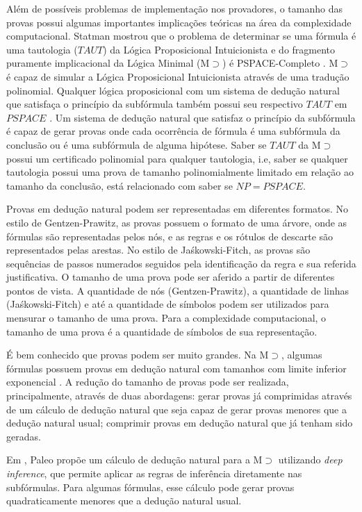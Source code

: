 Além de possíveis problemas de implementação nos provadores, o tamanho das provas possui algumas importantes implicações teóricas na área da complexidade computacional. Statman mostrou que o problema de determinar se uma fórmula é uma tautologia ($TAUT$) da Lógica Proposicional Intuicionista e do fragmento puramente implicacional da Lógica Minimal (M$\supset$) é PSPACE-Completo \cite{STATMAN197967}. M$\supset$ é capaz de simular a Lógica Proposicional Intuicionista através de uma tradução polinomial. Qualquer lógica proposicional com um sistema de dedução natural que satisfaça o princípio da subfórmula também possui seu respectivo $TAUT$ em $PSPACE$ \cite{Haeusler2014}. Um sistema de dedução natural que satisfaz o princípio da subfórmula é capaz de gerar provas onde cada ocorrência de fórmula é uma subfórmula da conclusão ou é uma subfórmula de alguma hipótese. Saber se $TAUT$ da M$\supset$ possui um certificado polinomial para qualquer tautologia, i.e, saber se qualquer tautologia possui uma prova de tamanho polinomialmente limitado em relação ao tamanho da conclusão, está relacionado com saber se $NP = PSPACE$.

Provas em dedução natural podem ser representadas em diferentes formatos. No estilo de Gentzen-Prawitz, as provas possuem o formato de uma árvore, onde as fórmulas são representadas pelos nós, e as regras e os rótulos de descarte são representados pelas arestas. No estilo de Ja{\'s}kowski-Fitch, as provas são sequências de passos numerados seguidos pela identificação da regra e sua referida justificativa. O tamanho de uma prova pode ser aferido a partir de diferentes pontos de vista. A quantidade de nós (Gentzen-Prawitz), a quantidade de linhas (Ja{\'s}kowski-Fitch) e até a quantidade de símbolos podem ser utilizados para mensurar o tamanho de uma prova. Para a complexidade computacional, o tamanho de uma prova é a quantidade de símbolos de sua representação.

É bem conhecido que provas podem ser muito grandes. Na M$\supset$, algumas fórmulas possuem provas em dedução natural com tamanhos com limite inferior exponencial \cite{haeusler2015many}. A redução do tamanho de provas pode ser realizada, principalmente, através de duas abordagens: gerar provas já comprimidas através de um cálculo de dedução natural que seja capaz de gerar provas menores que a dedução natural usual; comprimir provas em dedução natural que já tenham sido geradas.

Em \cite{NDcPaleo, paleo2015implementation}, Paleo propõe um cálculo de dedução natural para a M$\supset$ utilizando \textit{deep inference}, que permite aplicar as regras de inferência diretamente nas subfórmulas. Para algumas fórmulas, esse cálculo pode gerar provas quadraticamente menores que a dedução natural usual.

